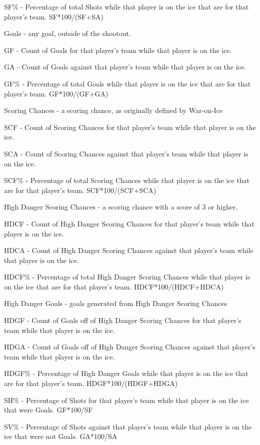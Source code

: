 \documentclass[12pt]{article}
\begin{document}
SF\% - Percentage of total Shots while that player is on the ice that are for that player's team. SF*100/(SF+SA)

Goals - any goal, outside of the shootout.

GF - Count of Goals for that player's team while that player is on the ice.

GA - Count of Goals against that player's team while that player is on the ice.

GF\% - Percentage of total Goals while that player is on the ice that are for that player's team. GF*100/(GF+GA)

Scoring Chances - a scoring chance, as originally defined by War-on-Ice

SCF - Count of Scoring Chances for that player's team while that player is on the ice.

SCA - Count of Scoring Chances against that player's team while that player is on the ice.

SCF\% - Percentage of total Scoring Chances while that player is on the ice that are for that player's team. SCF*100/(SCF+SCA)

High Danger Scoring Chances - a scoring chance with a score of 3 or higher.

HDCF - Count of High Danger Scoring Chances for that player's team while that player is on the ice.

HDCA - Count of High Danger Scoring Chances against that player's team while that player is on the ice.

HDCF\% - Percentage of total High Danger Scoring Chances while that player is on the ice that are for that player's team. HDCF*100/(HDCF+HDCA)

High Danger Goals - goals generated from High Danger Scoring Chances

HDGF - Count of Goals off of High Danger Scoring Chances for that player's team while that player is on the ice.

HDGA - Count of Goals off of High Danger Scoring Chances against that player's team while that player is on the ice.

HDGF\% - Percentage of High Danger Goals while that player is on the ice that are for that player's team. HDGF*100/(HDGF+HDGA)

SH\% - Percentage of Shots for that player's team while that player is on the ice that were Goals. GF*100/SF

SV\% - Percentage of Shots against that player's team while that player is on the ice that were not Goals. GA*100/SA
\end{document}
